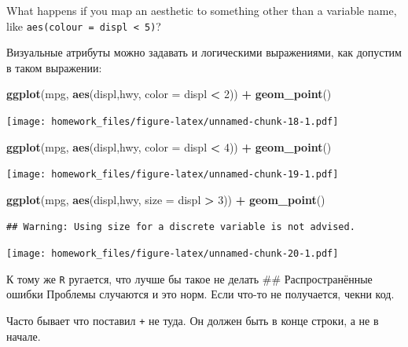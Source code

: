 \documentclass[]{book}
\newenvironment{Shaded}{\begin{snugshade}}{\end{snugshade}}
\newcommand{\KeywordTok}[1]{\textcolor[rgb]{0.13,0.29,0.53}{\textbf{#1}}}
\newcommand{\DataTypeTok}[1]{\textcolor[rgb]{0.13,0.29,0.53}{#1}}
\newcommand{\DecValTok}[1]{\textcolor[rgb]{0.00,0.00,0.81}{#1}}
\newcommand{\StringTok}[1]{\textcolor[rgb]{0.31,0.60,0.02}{#1}}
\newcommand{\OperatorTok}[1]{\textcolor[rgb]{0.81,0.36,0.00}{\textbf{#1}}}
\newcommand{\NormalTok}[1]{#1}
\begin{document}
What happens if you map an aesthetic to something other than a variable
name, like \texttt{aes(colour\ =\ displ\ \textless{}\ 5)}?

Визуальные атрибуты можно задавать и логическими выражениями, как
допустим в таком выражении:

\begin{Shaded}
\begin{Highlighting}[]
 \KeywordTok{ggplot}\NormalTok{(mpg, }\KeywordTok{aes}\NormalTok{(displ,hwy, }\DataTypeTok{color =}\NormalTok{ displ }\OperatorTok{<}\StringTok{ }\DecValTok{2}\NormalTok{)) }\OperatorTok{+}
\StringTok{   }\KeywordTok{geom_point}\NormalTok{()}
\end{Highlighting}
\end{Shaded}

\texttt{[image: homework\_files/figure-latex/unnamed-chunk-18-1.pdf]}

\begin{Shaded}
\begin{Highlighting}[]
 \KeywordTok{ggplot}\NormalTok{(mpg, }\KeywordTok{aes}\NormalTok{(displ,hwy, }\DataTypeTok{color =}\NormalTok{ displ }\OperatorTok{<}\StringTok{ }\DecValTok{4}\NormalTok{)) }\OperatorTok{+}
\StringTok{   }\KeywordTok{geom_point}\NormalTok{()}
\end{Highlighting}
\end{Shaded}

\texttt{[image: homework\_files/figure-latex/unnamed-chunk-19-1.pdf]}

\begin{Shaded}
\begin{Highlighting}[]
 \KeywordTok{ggplot}\NormalTok{(mpg, }\KeywordTok{aes}\NormalTok{(displ,hwy, }\DataTypeTok{size =}\NormalTok{ displ }\OperatorTok{>}\StringTok{ }\DecValTok{3}\NormalTok{)) }\OperatorTok{+}
\StringTok{   }\KeywordTok{geom_point}\NormalTok{()}
\end{Highlighting}
\end{Shaded}

\begin{verbatim}
## Warning: Using size for a discrete variable is not advised.
\end{verbatim}

\texttt{[image: homework\_files/figure-latex/unnamed-chunk-20-1.pdf]}

К тому же \texttt{R} ругается, что лучше бы такое не делать \#\#
Распространённые ошибки Проблемы случаются и это норм. Если что-то не
получается, чекни код.

Часто бывает что поставил \texttt{+} не туда. Он должен быть в конце
строки, а не в начале.
\end{document}
